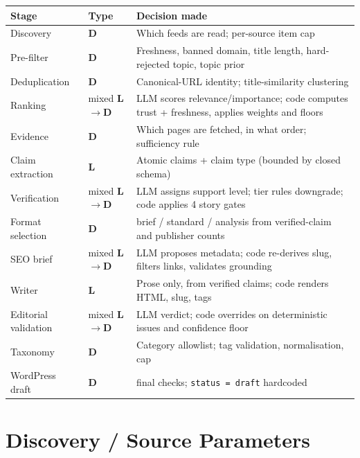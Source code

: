 \documentclass[10pt,a4paper]{article}
\newcommand{\cd}[1]{\texttt{\footnotesize\hyphenpenalty=0\exhyphenpenalty=0\relax #1}}
\newcommand{\D}{\textcolor{go}{\textbf{D}}}
\newcommand{\Lm}{\textcolor{ac}{\textbf{L}}}
\newcommand{\LD}{\textcolor{hd}{\textbf{L$\rightarrow$D}}}
\begin{document}
\vspace{-0.5em}
\begin{center}\footnotesize
\begin{tabularx}{\textwidth}{@{}l l >{\RaggedRight}X@{}}
\toprule
\textbf{Stage} & \textbf{Type} & \textbf{Decision made} \\
\midrule
Discovery & \D & Which feeds are read; per-source item cap \\
Pre-filter & \D & Freshness, banned domain, title length, hard-rejected topic, topic prior \\
Deduplication & \D & Canonical-URL identity; title-similarity clustering \\
Ranking & mixed \LD & LLM scores relevance/importance; code computes trust + freshness, applies weights and floors \\
Evidence & \D & Which pages are fetched, in what order; sufficiency rule \\
Claim extraction & \Lm & Atomic claims + claim type (bounded by closed schema) \\
Verification & mixed \LD & LLM assigns support level; tier rules downgrade; code applies 4 story gates \\
Format selection & \D & brief / standard / analysis from verified-claim and publisher counts \\
SEO brief & mixed \LD & LLM proposes metadata; code re-derives slug, filters links, validates grounding \\
Writer & \Lm & Prose only, from verified claims; code renders HTML, slug, tags \\
Editorial validation & mixed \LD & LLM verdict; code overrides on deterministic issues and confidence floor \\
Taxonomy & \D & Category allowlist; tag validation, normalisation, cap \\
WordPress draft & \D & 9 final checks; \cd{status = draft} hardcoded \\
\bottomrule
\end{tabularx}
\end{center}

\section{Discovery / Source Parameters}
\end{document}
